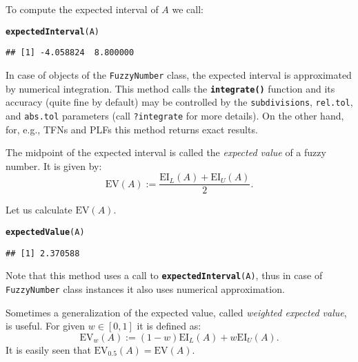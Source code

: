 \documentclass[11pt]{article}\usepackage[]{graphicx}\usepackage[]{color}
\makeatletter
\newcommand{\hlstd}[1]{\textcolor[rgb]{0.345,0.345,0.345}{#1}}%
\newcommand{\hlkwc}[1]{\textcolor[rgb]{0.333,0.667,0.333}{#1}}%
\newcommand{\hlkwd}[1]{\textcolor[rgb]{0.737,0.353,0.396}{\textbf{#1}}}%
\newenvironment{kframe}{%
 \def\at@end@of@kframe{}%
 \ifinner\ifhmode%
  \def\at@end@of@kframe{\end{minipage}}%
  \begin{minipage}{\columnwidth}%
 \fi\fi%
 \def\FrameCommand##1{\hskip\@totalleftmargin \hskip-\fboxsep
 \colorbox{shadecolor}{##1}\hskip-\fboxsep
     \hskip-\linewidth \hskip-\@totalleftmargin \hskip\columnwidth}%
 \MakeFramed {\advance\hsize-\width
   \@totalleftmargin\z@ \linewidth\hsize
   \@setminipage}}%
 {\par\unskip\endMakeFramed%
 \at@end@of@kframe}
\newenvironment{knitrout}{}{} %
\newcommand{\func}[1]{\texttt{\hlkwd{#1}}}
\newcommand{\argument}[1]{\texttt{\hlkwc{#1}}}
\makeatother
\begin{document}
\noindent
To compute the expected interval of $A$ we call:

\begin{knitrout}\small
{}\color{fgcolor}\begin{kframe}
\begin{alltt}
\hlkwd{expectedInterval}\hlstd{(A)}
\end{alltt}
\begin{verbatim}
## [1] -4.058824  8.800000
\end{verbatim}
\end{kframe}
\end{knitrout}

\noindent
In case of objects of
the \texttt{FuzzyNumber} class, the expected interval is approximated
by numerical integration. This method calls the \func{integrate()} function
and its accuracy (quite fine by default)
may be controlled by the \argument{subdivisions},
\argument{rel.tol}, and \argument{abs.tol} parameters
(call \texttt{?integrate} for more details).
On the other hand, for, e.g., TFNs and PLFs this method returns exact results.

\bigskip
The midpoint of the expected interval is called the \textit{expected value}
of a fuzzy number. It is given by:
\begin{equation}
\mathrm{EV}(A) := \frac{\mathrm{EI}_L(A) + \mathrm{EI}_U(A)}{2}.
\end{equation}

\noindent
Let us calculate $\mathrm{EV}(A)$.

\begin{knitrout}\small
{}\color{fgcolor}\begin{kframe}
\begin{alltt}
\hlkwd{expectedValue}\hlstd{(A)}
\end{alltt}
\begin{verbatim}
## [1] 2.370588
\end{verbatim}
\end{kframe}
\end{knitrout}

\noindent
Note that this method uses a call to \texttt{\func{expectedInterval}(A)},
thus in case of \texttt{FuzzyNumber} class instances it also uses
numerical approximation.

Sometimes a generalization of the expected value,
called \textit{weighted expected value}, is useful.
For given $w\in[0,1]$ it is defined as:
\begin{equation}
\mathrm{EV}_w(A) := (1-w)\mathrm{EI}_L(A) + w\mathrm{EI}_U(A).
\end{equation}
It is easily seen that $\mathrm{EV}_{0.5}(A)=\mathrm{EV}(A)$.
\end{document}
